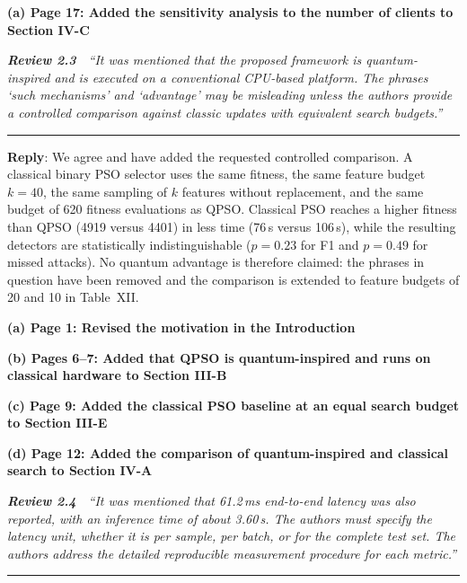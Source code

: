 \documentclass[11pt]{article}
\newcommand{\review}[2]{\par\bigskip\noindent\textbf{\textit{Review #1}}\ \ \textit{``#2''}\par\smallskip\hrule\medskip}
\newcommand{\reply}{\noindent\textbf{Reply}: }
\newcommand{\loc}[1]{\par\medskip\noindent\textbf{#1}\par}
\begin{document}
\loc{(a) Page 17: Added the sensitivity analysis to the number of clients to Section IV-C}

\review{2.3}{It was mentioned that the proposed framework is quantum-inspired and is executed on a conventional CPU-based platform. The phrases `such mechanisms' and `advantage' may be misleading unless the authors provide a controlled comparison against classic updates with equivalent search budgets.}

\reply We agree and have added the requested controlled comparison. A
classical binary PSO selector uses the same fitness, the same feature budget
$k=40$, the same sampling of $k$ features without replacement, and the same budget of 620 fitness
evaluations as QPSO. Classical PSO reaches a higher fitness than QPSO (4919
versus 4401) in less time (76\,s versus 106\,s), while the resulting detectors
are statistically indistinguishable ($p=0.23$ for F1 and $p=0.49$ for missed
attacks). No quantum advantage is therefore claimed: the phrases in question
have been removed and the comparison is extended to
feature budgets of 20 and 10 in Table~XII.

\loc{(a) Page 1: Revised the motivation in the Introduction}

\loc{(b) Pages 6--7: Added that QPSO is quantum-inspired and runs on classical hardware to Section III-B}

\loc{(c) Page 9: Added the classical PSO baseline at an equal search budget to Section III-E}

\loc{(d) Page 12: Added the comparison of quantum-inspired and classical search to Section IV-A}

\review{2.4}{It was mentioned that 61.2\,ms end-to-end latency was also reported, with an inference time of about 3.60\,s. The authors must specify the latency unit, whether it is per sample, per batch, or for the complete test set. The authors address the detailed reproducible measurement procedure for each metric.}
\end{document}

